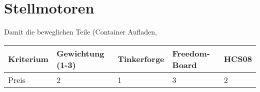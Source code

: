 \section{Stellmotoren}

Damit die beweglichen Teile (Container Aufladen, 
\begin{table}[h]
\begin{tabular}{|p{4.5cm}|p{3.5cm}|p{2cm}|p{2cm}|p{2cm}|}\hline
	
	\textbf{Kriterium}	& 	\textbf{Gewichtung (1-3)} & \textbf{Tinkerforge} & \textbf{Freedom-Board} & \textbf{HCS08}\\\hline
	{Preis}	& 	{2} & {1} & {3} & {2}\\\hline
	
\end{tabular}\\
\end{table}